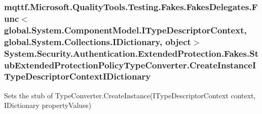 \hypertarget{class_system_1_1_security_1_1_authentication_1_1_extended_protection_1_1_fakes_1_1_stub_extendedf67afed15bbc0df07bfc91316f6f81f0_a42c68b29bee139569ee9eb09f525d6ce}{
\subsubsection[{Create\-Instance\-I\-Type\-Descriptor\-Context\-I\-Dictionary}]{\setlength{\rightskip}{0pt plus 5cm}mqttf.\-Microsoft.\-Quality\-Tools.\-Testing.\-Fakes.\-Fakes\-Delegates.\-Func$<$global.\-System.\-Component\-Model.\-I\-Type\-Descriptor\-Context, global.\-System.\-Collections.\-I\-Dictionary, object$>$ System.\-Security.\-Authentication.\-Extended\-Protection.\-Fakes.\-Stub\-Extended\-Protection\-Policy\-Type\-Converter.\-Create\-Instance\-I\-Type\-Descriptor\-Context\-I\-Dictionary}}\label{class_system_1_1_security_1_1_authentication_1_1_extended_protection_1_1_fakes_1_1_stub_extendedf67afed15bbc0df07bfc91316f6f81f0_a42c68b29bee139569ee9eb09f525d6ce}


Sets the stub of Type\-Converter.\-Create\-Instance(\-I\-Type\-Descriptor\-Context context, I\-Dictionary property\-Values)

